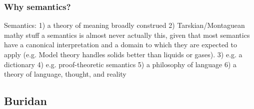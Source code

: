\documentclass[]{article}
\begin{document}
\subsubsection{Why semantics?}
Semantics: 
1) a theory of meaning broadly construed
2) Tarskian/Montaguean mathy stuff
	a semantics is almost never actually this, given that most semantics have a canonical interpretation and a domain to which they are expected to apply (e.g. Model theory handles solids better than liquids or gases).
3) e.g. a dictionary
4) e.g. proof-theoretic semantics
5) a philosophy of language
6) a theory of language, thought, and reality



\subsection{Buridan}

\end{document}
